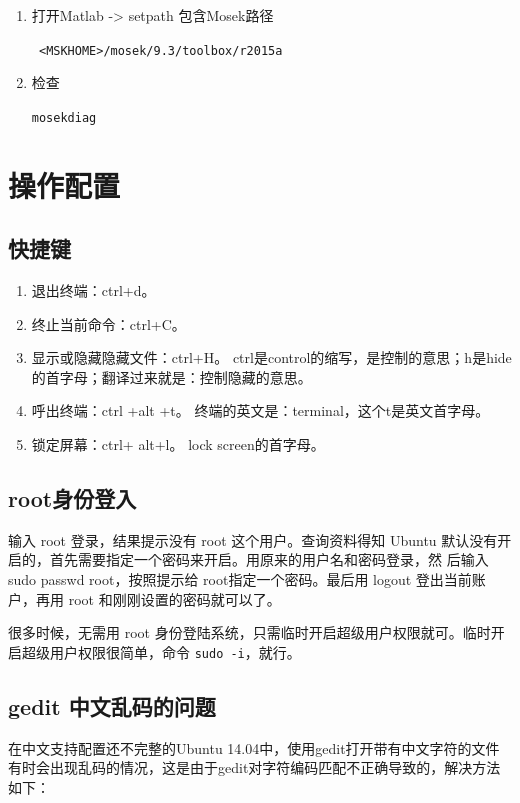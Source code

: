 {\begin{enumerate}
\item 打开Matlab -> setpath 包含Mosek路径

\verb| <MSKHOME>/mosek/9.3/toolbox/r2015a|

\item 检查

\verb|mosekdiag|
\end{enumerate}






\chapter{操作配置}
\section{快捷键}
\begin{enumerate}
\item 退出终端：ctrl+d。

\item 终止当前命令：ctrl+C。

\item 显示或隐藏隐藏文件：ctrl+H。 ctrl是control的缩写，是控制的意思；h是hide的首字母；翻译过来就是：控制隐藏的意思。

\item 呼出终端：ctrl +alt +t。 终端的英文是：terminal，这个t是英文首字母。

\item 锁定屏幕：ctrl+ alt+l。 lock screen的首字母。
\end{enumerate}



\section{root身份登入}
输入 root 登录，结果提示没有 root 这个用户。查询资料得知 Ubuntu 默认没有开启的，首先需要指定一个密码来开启。用原来的用户名和密码登录，然 后输入sudo passwd root，按照提示给 root指定一个密码。最后用 logout 登出当前账户，再用 root 和刚刚设置的密码就可以了。

很多时候，无需用 root 身份登陆系统，只需临时开启超级用户权限就可。临时开启超级用户权限很简单，命令 \verb*|sudo -i|，就行。



\section{gedit 中文乱码的问题}
在中文支持配置还不完整的Ubuntu 14.04中，使用gedit打开带有中文字符的文件有时会出现乱码的情况，这是由于gedit对字符编码匹配不正确导致的，解决方法如下：

}
